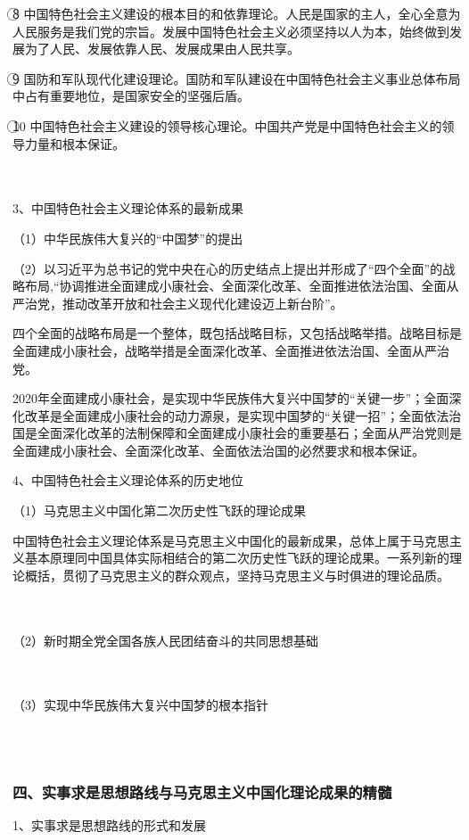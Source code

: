 \documentclass{ctexart}
\begin{document}
\textcircled{8}
中国特色社会主义建设的根本目的和依靠理论。人民是国家的主人，全心全意为人民服务是我们党的宗旨。发展中国特色社会主义必须坚持以人为本，始终做到发展为了人民、发展依靠人民、发展成果由人民共享。

\textcircled{9}
国防和军队现代化建设理论。国防和军队建设在中国特色社会主义事业总体布局中占有重要地位，是国家安全的坚强后盾。

\textcircled{10}
中国特色社会主义建设的领导核心理论。中国共产党是中国特色社会主义的领导力量和根本保证。

\\\\

3、中国特色社会主义理论体系的最新成果

（1）中华民族伟大复兴的“中国梦”的提出

（2）以习近平为总书记的党中央在心的历史结点上提出并形成了“四个全面”的战略布局,“协调推进全面建成小康社会、全面深化改革、全面推进依法治国、全面从严治党，推动改革开放和社会主义现代化建设迈上新台阶”。

四个全面的战略布局是一个整体，既包括战略目标，又包括战略举措。战略目标是全面建成小康社会，战略举措是全面深化改革、全面推进依法治国、全面从严治党。

2020年全面建成小康社会，是实现中华民族伟大复兴中国梦的“关键一步”；全面深化改革是全面建成小康社会的动力源泉，是实现中国梦的“关键一招”；全面依法治国是全面深化改革的法制保障和全面建成小康社会的重要基石；全面从严治党则是全面建成小康社会、全面深化改革、全面依法治国的必然要求和根本保证。

4、中国特色社会主义理论体系的历史地位

（1）马克思主义中国化第二次历史性飞跃的理论成果

中国特色社会主义理论体系是马克思主义中国化的最新成果，总体上属于马克思主义基本原理同中国具体实际相结合的第二次历史性飞跃的理论成果。一系列新的理论概括，贯彻了马克思主义的群众观点，坚持马克思主义与时俱进的理论品质。

\\\\
（2）新时期全党全国各族人民团结奋斗的共同思想基础

\\\\
（3）实现中华民族伟大复兴中国梦的根本指针

\\\\

\subsubsection{四、实事求是思想路线与马克思主义中国化理论成果的精髓}
1、实事求是思想路线的形式和发展
\end{document}
